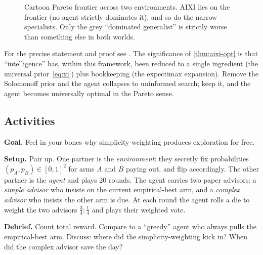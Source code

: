\begin{figure}[h]
\centering
{}
\caption{Cartoon Pareto frontier across two environments.  AIXI lies
on the frontier (no agent strictly dominates it), and so do the narrow
specialists.  Only the grey ``dominated generalist'' is strictly
worse than something else in both worlds.}
\label{fig:pareto}
\end{figure}

For the precise statement and proof see
\citet[Ch.~5]{hutter2005universal}.  The significance of
\cref{thm:aixi-opt} is that ``intelligence'' has, within this
framework, been reduced to a single ingredient (the universal
prior~\eqref{eq:xi}) plus bookkeeping (the expectimax expansion).
Remove the Solomonoff prior and the agent collapses to uninformed
search; keep it, and the agent becomes universally optimal in the
Pareto sense.

\subsection*{Activities}

\begin{activity}[title={Activity A: Two-armed bandit, live in the room}]
\textbf{Goal.}  Feel in your bones why simplicity-weighting produces
exploration for free.

\textbf{Setup.}  Pair up.  One partner is the \emph{environment}: they
secretly fix probabilities $(p_A, p_B)\in[0,1]^2$ for arms $A$ and $B$
paying out, and flip accordingly.  The other partner is the
\emph{agent} and plays $20$ rounds.  The agent carries two paper
advisors: a \emph{simple advisor} who insists on the current
empirical-best arm, and a \emph{complex advisor} who insists the other
arm is due.  At each round the agent rolls a die to weight the two
advisors $\tfrac{3}{4} : \tfrac{1}{4}$ and plays their weighted vote.

\textbf{Debrief.}  Count total reward.  Compare to a ``greedy'' agent
who always pulls the empirical-best arm.  Discuss: where did the
simplicity-weighting kick in?  When did the complex advisor save the
day?
\end{activity}

